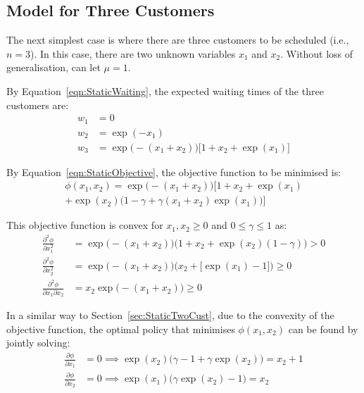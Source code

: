 \subsection{Model for Three Customers}

The next simplest case is where there are three customers to be scheduled (i.e., $n = 3$). In this case, there are two unknown variables $x_{1}$ and $x_{2}$. Without loss of generalisation, can let $\mu = 1$.

By Equation~\ref{eqn:StaticWaiting}, the expected waiting times of the three customers are:
\begin{align}
	w_{1} & = 0 \\
	w_{2} & = \exp (- x_{1}) \\
	w_{3} & = \exp \Big( - (x_{1} + x_{2}) \Big) \Big[ 1 + x_{2} + \exp (x_{1}) \Big]
\end{align}

By Equation~\ref{eqn:StaticObjective}, the objective function to be minimised is:
\begin{multline}
	\phi (x_{1}, x_{2}) = \exp \Big( - (x_{1} + x_{2}) \Big) \Bigg[ 1 + x_{2} + \exp (x_{1}) \\
	+ \exp (x_{2}) \Big( 1 - \gamma + \gamma (x_{1} + x_{2}) \exp (x_{1}) \Big) \Bigg]
\end{multline}

This objective function is convex for $x_{1}, x_{2} \geq 0$ and $0 \leq \gamma \leq 1$ as:
\begin{align}
	\frac{\partial^{2} \phi}{\partial x_{1}^{2}} & = \exp \Big( - (x_{1} + x_{2}) \Big) \Big( 1 + x_{2} + \exp (x_{2}) (1 - \gamma) \Big) > 0 \\
	\frac{\partial^{2} \phi}{\partial x_{2}^{2}} & = \exp \Big( - (x_{1} + x_{2}) \Big) \Big( x_{2} + \big[ \exp (x_{1}) - 1 \big] \Big) \geq 0 \\
	\frac{\partial^{2} \phi}{\partial x_{1} \partial x_{2}} & = x_{2} \exp \Big( - (x_{1} + x_{2}) \Big) \geq 0
\end{align}

In a similar way to Section~\ref{sec:StaticTwoCust}, due to the convexity of the objective function, the optimal policy that minimises $\phi (x_{1}, x_{2})$ can be found by jointly solving:
\begin{align}
	\frac{\partial \phi}{\partial x_{1}} & = 0 \implies \exp (x_{2}) \Big( \gamma - 1 + \gamma \exp (x_{2}) \Big) = x_{2} + 1 \\
	\frac{\partial \phi}{\partial x_{2}} & = 0 \implies \exp (x_{1}) \Big( \gamma \exp (x_{2}) - 1 \Big) = x_{2}
\end{align}

